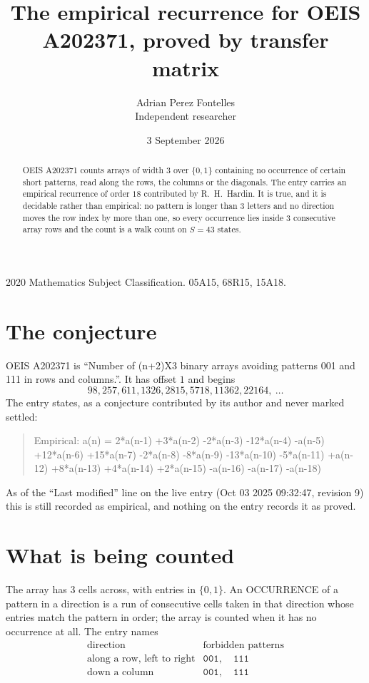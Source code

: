 \documentclass[11pt,a4paper]{article}
\title{The empirical recurrence for OEIS A202371, proved by transfer matrix}
\author{Adrian Perez Fontelles\\ \small Independent researcher}
\date{3 September 2026}
\theoremstyle{plain}
\theoremstyle{definition}
\begin{document}
\maketitle

\begin{abstract}
OEIS A202371 counts arrays of width $3$ over $\{0,1\}$ containing no occurrence of certain short
patterns, read along the rows, the columns or the diagonals. The entry carries an empirical
recurrence of order $18$ contributed by R.~H.~Hardin. It is true, and it is decidable
rather than empirical: no pattern is longer than $3$ letters and no direction moves the row
index by more than one, so every occurrence lies inside $3$ consecutive array rows and the
count is a walk count on $S=43$ states.
\end{abstract}

\noindent\small 2020 Mathematics Subject Classification. 05A15, 68R15, 15A18.\normalsize

\section{The conjecture}

OEIS A202371 is ``Number of (n+2)X3 binary arrays avoiding patterns 001 and 111 in rows and columns.''. It has offset $1$ and begins
\[
98, 257, 611, 1326, 2815, 5718, 11362, 22164,\ \dots
\]
The entry states, as a conjecture contributed by its author and never marked settled:
\begin{quote}
Empirical: a(n) = 2*a(n-1) +3*a(n-2) -2*a(n-3) -12*a(n-4) -a(n-5) +12*a(n-6) +15*a(n-7) -2*a(n-8) -8*a(n-9) -13*a(n-10) -5*a(n-11) +a(n-12) +8*a(n-13) +4*a(n-14) +2*a(n-15) -a(n-16) -a(n-17) -a(n-18)
\end{quote}
As of the ``Last modified'' line on the live entry (Oct 03 2025 09:32:47, revision 9) this is still
recorded as empirical, and nothing on the entry records it as proved.

\section{What is being counted}

The array has $3$ cells across, with entries in $\{0,1\}$. An OCCURRENCE of a pattern in a
direction is a run of consecutive cells taken in that direction whose entries match the pattern
in order; the array is counted when it has no occurrence at all. The entry names
\[
\begin{array}{ll}
\text{direction} & \text{forbidden patterns} \\[2pt]
\text{along a row, left to right} & \mathtt{001},\quad \mathtt{111} \\
\text{down a column} & \mathtt{001},\quad \mathtt{111} \\
\end{array}
\]
\end{document}
